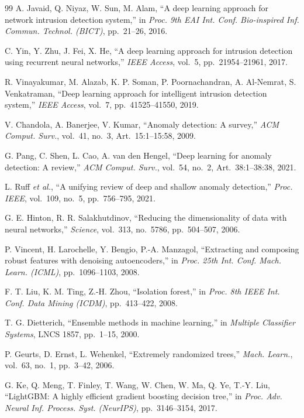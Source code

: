 \documentclass[journal]{IEEEtran}
\begin{document}
\begin{thebibliography}{99}
A. Javaid, Q. Niyaz, W. Sun, M. Alam, ``A deep learning approach for network intrusion detection system,'' in \textit{Proc. 9th EAI Int. Conf. Bio-inspired Inf. Commun. Technol. (BICT)}, pp.~21--26, 2016.

C. Yin, Y. Zhu, J. Fei, X. He, ``A deep learning approach for intrusion detection using recurrent neural networks,'' \textit{IEEE Access}, vol.~5, pp.~21954--21961, 2017.

R. Vinayakumar, M. Alazab, K. P. Soman, P. Poornachandran, A. Al-Nemrat, S. Venkatraman, ``Deep learning approach for intelligent intrusion detection system,'' \textit{IEEE Access}, vol.~7, pp.~41525--41550, 2019.

V. Chandola, A. Banerjee, V. Kumar, ``Anomaly detection: A survey,'' \textit{ACM Comput. Surv.}, vol.~41, no.~3, Art.~15:1--15:58, 2009.

G. Pang, C. Shen, L. Cao, A. van den Hengel, ``Deep learning for anomaly detection: A review,'' \textit{ACM Comput. Surv.}, vol.~54, no.~2, Art.~38:1--38:38, 2021.

L. Ruff \textit{et al.}, ``A unifying review of deep and shallow anomaly detection,'' \textit{Proc. IEEE}, vol.~109, no.~5, pp.~756--795, 2021.

G. E. Hinton, R. R. Salakhutdinov, ``Reducing the dimensionality of data with neural networks,'' \textit{Science}, vol.~313, no.~5786, pp.~504--507, 2006.

P. Vincent, H. Larochelle, Y. Bengio, P.-A. Manzagol, ``Extracting and composing robust features with denoising autoencoders,'' in \textit{Proc. 25th Int. Conf. Mach. Learn. (ICML)}, pp.~1096--1103, 2008.

F. T. Liu, K. M. Ting, Z.-H. Zhou, ``Isolation forest,'' in \textit{Proc. 8th IEEE Int. Conf. Data Mining (ICDM)}, pp.~413--422, 2008.

T. G. Dietterich, ``Ensemble methods in machine learning,'' in \textit{Multiple Classifier Systems}, LNCS 1857, pp.~1--15, 2000.

P. Geurts, D. Ernst, L. Wehenkel, ``Extremely randomized trees,'' \textit{Mach. Learn.}, vol.~63, no.~1, pp.~3--42, 2006.

G. Ke, Q. Meng, T. Finley, T. Wang, W. Chen, W. Ma, Q. Ye, T.-Y. Liu, ``{LightGBM}: A highly efficient gradient boosting decision tree,'' in \textit{Proc. Adv. Neural Inf. Process. Syst. (NeurIPS)}, pp.~3146--3154, 2017.


\end{thebibliography}
\end{document}
